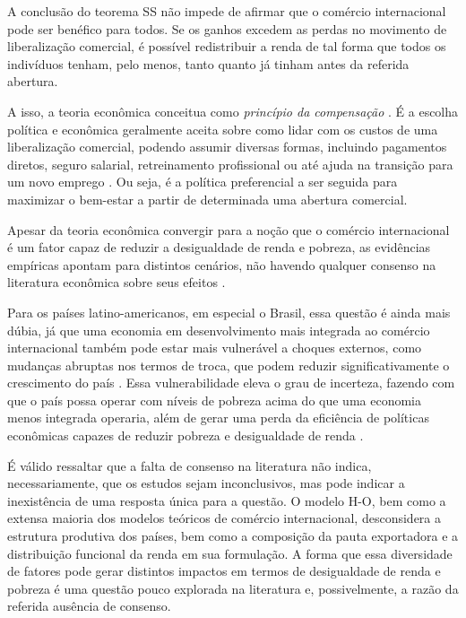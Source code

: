 A conclusão do teorema SS não impede de afirmar que o comércio internacional pode ser benéfico para todos. Se os ganhos excedem as perdas no movimento de liberalização comercial, é possível redistribuir a renda de tal forma que todos os indivíduos tenham, pelo menos, tanto quanto já tinham antes da referida abertura.

A isso, a teoria econômica conceitua como \textit{princípio da compensação} \cite{irwin98}. É a escolha política e econômica geralmente aceita sobre como lidar com os custos de uma liberalização comercial, podendo assumir diversas formas, incluindo pagamentos diretos, seguro salarial, retreinamento profissional ou até ajuda na transição para um novo emprego \cite{kolben21}. Ou seja, é a política preferencial a ser seguida para maximizar o bem-estar a partir de determinada uma abertura comercial.

Apesar da teoria econômica convergir para a noção que o comércio internacional é um fator capaz de reduzir a desigualdade de renda e pobreza, as evidências empíricas apontam para distintos cenários, não havendo qualquer consenso na literatura econômica sobre seus efeitos \cite{winters04}. 

Para os países latino-americanos, em especial o Brasil, essa questão é ainda mais dúbia, já que uma economia em desenvolvimento mais integrada ao comércio internacional também pode estar mais vulnerável a choques externos, como mudanças abruptas nos termos de troca, que podem reduzir significativamente o crescimento do país \cite{bannisterthugge01}. Essa vulnerabilidade eleva o grau de incerteza, fazendo com que o país possa operar com níveis de pobreza acima do que uma economia menos integrada operaria, além de gerar uma perda da eficiência de políticas econômicas capazes de reduzir pobreza e desigualdade de renda \cite{winters02}.

É válido ressaltar que a falta de consenso na literatura não indica, necessariamente, que os estudos sejam inconclusivos, mas pode indicar a inexistência de uma resposta única para a questão. O modelo H-O, bem como a extensa maioria dos modelos teóricos de comércio internacional, desconsidera a estrutura produtiva dos países, bem como a composição da pauta exportadora e a distribuição funcional da renda em sua formulação. A forma que essa diversidade de fatores pode gerar distintos impactos em termos de desigualdade de renda e pobreza é uma questão pouco explorada na literatura e, possivelmente, a razão da referida ausência de consenso.

